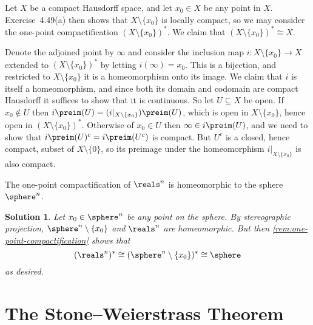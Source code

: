 \documentclass[article, a4paper, 11pt, oneside]{memoir}
\numberwithin{equation}{chapter}
\theoremstyle{nonumberplain}
\newtheorem{solution}{Solution}
\begin{document}
\begin{remark}
	\label{rem:one-point-compactification}
	Let $X$ be a compact Hausdorff space, and let $x_0 \in X$ be any point in $X$. Exercise~4.49(a) then shows that $X \setminus \{x_0\}$ is locally compact, so we may consider the one-point compactification $(X \setminus \{x_0\})^*$. We claim that $(X \setminus \{x_0\})^* \cong X$.
	
	Denote the adjoined point by $\infty$ and consider the inclusion map $i \colon X \setminus \{x_0\} \to X$ extended to $(X \setminus \{x_0\})^*$ by letting $i(\infty) = x_0$. This is a bijection, and restricted to $X \setminus \{x_0\}$ it is a homeomorphism onto its image. We claim that $i$ is itself a homeomorphism, and since both its domain and codomain are compact Hausdorff it suffices to show that it is continuous. So let $U \subseteq X$ be open. If $x_0 \not\in U$ then $i\preim(U) = (i|_{X \setminus \{x_0\}})\preim(U)$, which is open in $X \setminus \{x_0\}$, hence open in $(X \setminus \{x_0\})^*$. Otherwise of $x_0 \in U$ then $\infty \in i\preim(U)$, and we need to show that $i\preim(U)^c = i\preim(U^c)$ is compact. But $U^c$ is a closed, hence compact, subset of $X \setminus \{0\}$, so its preimage under the homeomorphism $i|_{X \setminus \{x_0\}}$ is also compact.
\end{remark}


\begin{exerciseframed*}[52]
	The one-point compactification of $\reals^n$ is homeomorphic to the sphere $\sphere^n$.
\end{exerciseframed*}

\begin{solution}
	Let $x_0 \in \sphere^n$ be any point on the sphere. By stereographic projection, $\sphere^n \setminus \{x_0\}$ and $\reals^n$ are homeomorphic. But then \cref{rem:one-point-compactification} shows that
	\begin{equation*}
		(\reals^n)^*
			\cong (\sphere^n \setminus \{x_0\})^*
			\cong \sphere
	\end{equation*}
	as desired.
\end{solution}


\addtocounter{section}{1}
\section{The Stone--Weierstrass Theorem}
\end{document}
